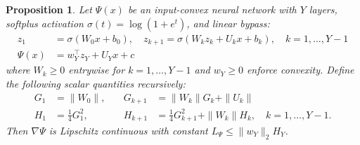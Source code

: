\documentclass[11pt, a4paper]{article}
\newtheorem{proposition}[theorem]{Proposition}
\theoremstyle{remark}
\theoremstyle{plain}
\begin{document}
\begin{proposition}
\label{prop:ICNN-lipschitz}
Let $\Psi(x)$ be an input-convex neural network with $Y$ layers, softplus activation $\sigma(t)=\log(1+e^t)$, and linear bypass:
\[
\begin{aligned}
z_1&=\sigma(W_0x+b_0),\quad
z_{k+1}=\sigma(W_kz_k+U_kx+b_k),\quad k=1,\ldots,Y-1
\\
\Psi(x)&=w_Y^\top z_Y+U_Yx+c
\end{aligned}
\]
where $W_k\geq0$ entrywise for $k=1,\ldots,Y-1$ and $w_Y\geq0$ enforce convexity. Define the following scalar quantities recursively:
\[
\begin{aligned}
G_1&=\|W_0\|,\quad &G_{k+1}&=\|W_k\|G_k+\|U_k\|\\
H_1&=\tfrac14G_1^2,\quad &H_{k+1}&=\tfrac14G_{k+1}^2+\|W_k\|H_k,\quad k=1,\ldots,Y-1.
\end{aligned}
\]
Then $\nabla\Psi$ is Lipschitz continuous with constant $L_\Psi\leq\|w_Y\|_2H_Y$.
\end{proposition}
\end{document}
